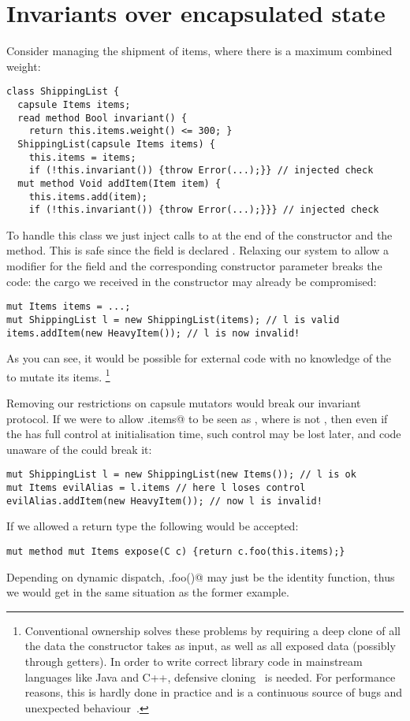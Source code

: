 \section{Invariants over encapsulated state}
\label{s:encapsulated}
Consider managing the shipment of items, where there is a maximum combined weight:
\begin{lstlisting}
class ShippingList {
  capsule Items items;
  read method Bool invariant() {
    return this.items.weight() <= 300; }
  ShippingList(capsule Items items) {
    this.items = items;
    if (!this.invariant()) {throw Error(...);}} // injected check
  mut method Void addItem(Item item) {
    this.items.add(item);
    if (!this.invariant()) {throw Error(...);}}} // injected check
\end{lstlisting}

To handle this class we just inject calls to \Q@invariant@ at the end of the constructor and the \Q@addItem@ method.
This is safe since the \Q@items@ field is declared \Q@capsule@.
Relaxing our system to allow a \Q@mut@ modifier for
the \Q@items@ field and the corresponding constructor parameter 
breaks the code:
the cargo we received in the constructor may already be compromised:
\begin{lstlisting}
mut Items items = ...;
mut ShippingList l = new ShippingList(items); // l is valid
items.addItem(new HeavyItem()); // l is now invalid!
\end{lstlisting}

As you can see, it would be possible for external code with no knowledge of the \Q@ShippingList@ to mutate its items.%
\footnote{%
Conventional ownership solves these problems by requiring a deep clone of all the data the constructor takes as input, as well as all exposed data (possibly through getters).
In order to write correct library code in mainstream languages like Java and C++, defensive cloning~\cite{Bloch08} is needed.
For performance reasons, this is hardly done in practice and is a continuous source of bugs and unexpected behaviour~\cite{Bloch08}.}

Removing our restrictions on capsule mutators 
would break our invariant protocol.
If we were to allow \Q@x.items@ to be seen as \Q@mut@, where \Q@x@ is not \Q@this@, then  even if the \Q@ShippingList@ has full control at initialisation time, such control may be lost later, and code unaware of the \Q@ShippingList@ could break it:
\begin{lstlisting}
mut ShippingList l = new ShippingList(new Items()); // l is ok
mut Items evilAlias = l.items // here l loses control
evilAlias.addItem(new HeavyItem()); // now l is invalid!
\end{lstlisting}
If we allowed a \Q@mut@ return type the following would be accepted:
\begin{lstlisting}
mut method mut Items expose(C c) {return c.foo(this.items);}
\end{lstlisting}
Depending on dynamic dispatch, \Q@c.foo()@ may just be the identity function, thus
we would get in the same situation as the former example.


